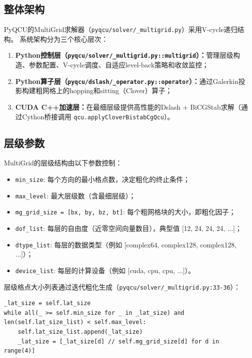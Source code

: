 \documentclass[11pt,a4paper]{article}
\begin{document}
\subsection{整体架构}

PyQCU的MultiGrid求解器（\texttt{pyqcu/solver/\_multigrid.py}）采用V-cycle递归结构。
系统架构分为三个核心层次：

\begin{enumerate}
    \item \textbf{Python控制层（\texttt{pyqcu/solver/\_multigrid.py::multigrid}）：}管理层级构造、参数配置、V-cycle调度、自适应level-back策略和收敛监控；
    \item \textbf{Python算子层（\texttt{pyqcu/dslash/\_operator.py::operator}）：}通过Galerkin投影构建粗网格上的hopping和sitting（Clover）算子；
    \item \textbf{CUDA C++加速层：}在最细层级提供高性能的Dslash + BiCGStab求解（通过Cython桥接调用 \texttt{qcu.applyCloverBistabCgQcu}）。
\end{enumerate}

\subsection{层级参数}

MultiGrid的层级结构由以下参数控制：

\begin{itemize}
    \item \texttt{min\_size}: 每个方向的最小格点数，决定粗化的终止条件；
    \item \texttt{max\_level}: 最大层级数（含最细层级）；
    \item \texttt{mg\_grid\_size = [bx, by, bz, bt]}: 每个粗网格块的大小，即粗化因子；
    \item \texttt{dof\_list}: 每层的自由度（近零空间向量数目），典型值 [12, 24, 24, 24, ...]；
    \item \texttt{dtype\_list}: 每层的数据类型（例如 [complex64, complex128, complex128, ...]）；
    \item \texttt{device\_list}: 每层的计算设备（例如 [cuda, cpu, cpu, ...]）。
\end{itemize}

层级格点大小列表通过迭代粗化生成（\texttt{pyqcu/solver/\_multigrid.py:33-36}）：

\begin{lstlisting}[style=pythonstyle]
_lat_size = self.lat_size
while all(_ >= self.min_size for _ in _lat_size) and len(self.lat_size_list) < self.max_level:
    self.lat_size_list.append(_lat_size)
    _lat_size = [_lat_size[d] // self.mg_grid_size[d] for d in range(4)]
\end{lstlisting}
\end{document}
